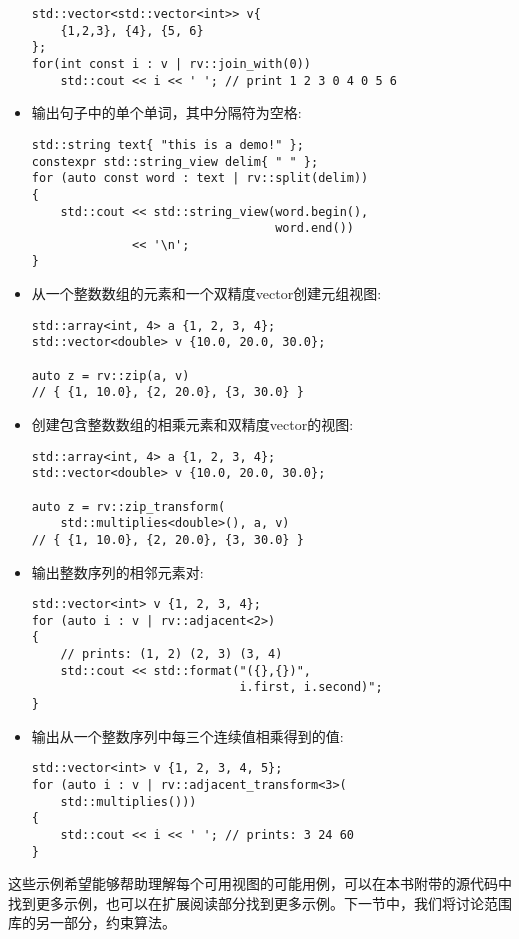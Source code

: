 \begin{itemize}
\begin{lstlisting}[style=styleCXX]
std::vector<std::vector<int>> v{
	{1,2,3}, {4}, {5, 6}
};
for(int const i : v | rv::join_with(0))
	std::cout << i << ' '; // print 1 2 3 0 4 0 5 6
\end{lstlisting}

\item
输出句子中的单个单词，其中分隔符为空格:

\begin{lstlisting}[style=styleCXX]
std::string text{ "this is a demo!" };
constexpr std::string_view delim{ " " };
for (auto const word : text | rv::split(delim))
{
	std::cout << std::string_view(word.begin(),
								  word.end())
			  << '\n';
}
\end{lstlisting}

\item
从一个整数数组的元素和一个双精度vector创建元组视图:

\begin{lstlisting}[style=styleCXX]
std::array<int, 4> a {1, 2, 3, 4};
std::vector<double> v {10.0, 20.0, 30.0};

auto z = rv::zip(a, v)
// { {1, 10.0}, {2, 20.0}, {3, 30.0} }
\end{lstlisting}

\item
创建包含整数数组的相乘元素和双精度vector的视图:

\begin{lstlisting}[style=styleCXX]
std::array<int, 4> a {1, 2, 3, 4};
std::vector<double> v {10.0, 20.0, 30.0};

auto z = rv::zip_transform(
	std::multiplies<double>(), a, v)
// { {1, 10.0}, {2, 20.0}, {3, 30.0} }
\end{lstlisting}

\item
输出整数序列的相邻元素对:

\begin{lstlisting}[style=styleCXX]
std::vector<int> v {1, 2, 3, 4};
for (auto i : v | rv::adjacent<2>)
{
	// prints: (1, 2) (2, 3) (3, 4)
	std::cout << std::format("({},{})",
							 i.first, i.second)";
}
\end{lstlisting}

\item
输出从一个整数序列中每三个连续值相乘得到的值:

\begin{lstlisting}[style=styleCXX]
std::vector<int> v {1, 2, 3, 4, 5};
for (auto i : v | rv::adjacent_transform<3>(
	std::multiplies()))
{
	std::cout << i << ' '; // prints: 3 24 60
}
\end{lstlisting}

\end{itemize}

这些示例希望能够帮助理解每个可用视图的可能用例，可以在本书附带的源代码中找到更多示例，也可以在扩展阅读部分找到更多示例。下一节中，我们将讨论范围库的另一部分，约束算法。












